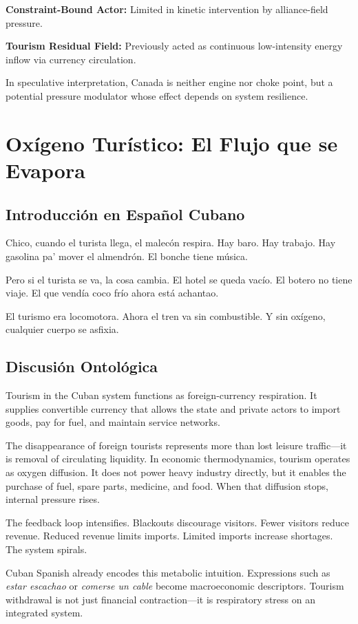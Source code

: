 \documentclass[12pt]{article}
\begin{document}
\textbf{Constraint-Bound Actor:} Limited in kinetic intervention by alliance-field pressure.

\textbf{Tourism Residual Field:} Previously acted as continuous low-intensity energy inflow via currency circulation.

In speculative interpretation, Canada is neither engine nor choke point, but a potential pressure modulator whose effect depends on system resilience.

\section{Oxígeno Turístico: El Flujo que se Evapora}

\subsection*{Introducción en Español Cubano}

Chico, cuando el turista llega, el malecón respira. Hay baro. Hay trabajo. Hay gasolina pa' mover el almendrón. El bonche tiene música.

Pero si el turista se va, la cosa cambia. El hotel se queda vacío. El botero no tiene viaje. El que vendía coco frío ahora está achantao.

El turismo era locomotora. Ahora el tren va sin combustible. Y sin oxígeno, cualquier cuerpo se asfixia.

\subsection*{Discusión Ontológica}

Tourism in the Cuban system functions as foreign-currency respiration. It supplies convertible currency that allows the state and private actors to import goods, pay for fuel, and maintain service networks.

The disappearance of foreign tourists represents more than lost leisure traffic---it is removal of circulating liquidity. In economic thermodynamics, tourism operates as oxygen diffusion. It does not power heavy industry directly, but it enables the purchase of fuel, spare parts, medicine, and food. When that diffusion stops, internal pressure rises.

The feedback loop intensifies. Blackouts discourage visitors. Fewer visitors reduce revenue. Reduced revenue limits imports. Limited imports increase shortages. The system spirals.

Cuban Spanish already encodes this metabolic intuition. Expressions such as \textit{estar escachao} or \textit{comerse un cable} become macroeconomic descriptors. Tourism withdrawal is not just financial contraction---it is respiratory stress on an integrated system.
\end{document}
